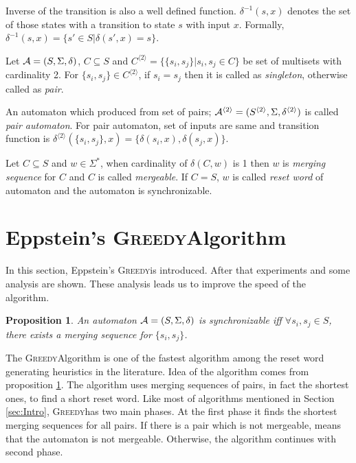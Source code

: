 \documentclass[12pt]{article}
\newtheorem{proposition}{Proposition}[section]
\newcommand{\comment}[2]{{\color{red}{\bf (#1: #2)}}}
\newcommand{\greedyAlgo}{\textsc{Greedy}}
\begin{document}
Inverse of the transition is also a well defined function. $\delta^{-1}(s,x)$ denotes the set of those states with a transition to state $s$ with input $x$. Formally, $\delta^{-1}(s,x) = \{ s' \in S | \delta(s',x)= s\}$.

Let ${\cal A}=(S, \Sigma, \delta)$, $C \subseteq S$ and $C^{\langle 2 \rangle} = \{ \{ s_i, s_j \}| s_i,s_j \in C \}$ be set of multisets  with cardinality 2. For $\{ s_i, s_j \} \in C^{\langle 2 \rangle}$, if $s_i=s_j$ then it is called as \textit{singleton}, otherwise called as \textit{pair}. 

An automaton which produced from set of pairs; ${\cal A}^{\langle 2 \rangle}=(S^{\langle 2 \rangle},\Sigma,\delta^{\langle 2 \rangle})$ is called \textit{pair automaton}. For pair automaton, set of inputs are same and transition function is $\delta^{\langle 2 \rangle}(\{ s_i,s_j \},x) = \{ \delta(s_i,x), \delta(s_j,x) \}$. \comment{sertac}{pair automata icin figure cizilebilir}

Let $C \subseteq S$ and $w \in \Sigma^*$, when cardinality of $\delta(C,w)$ is 1 then $w$ is \textit{merging sequence} for $C$ and $C$ is called \textit{mergeable}. If $C=S$, $w$ is called \textit{reset word} of automaton and the automaton is synchronizable.

\clearpage
\section{Eppstein's \greedyAlgo \space Algorithm}
\label{sec:greedy}
In this section, Eppstein's \greedyAlgo \space is introduced. After that experiments and some analysis are shown. These analysis leads us to improve the speed of the algorithm.

\begin{proposition}
	\label{prop:synchronizable}
	An automaton ${\cal A}=(S,\Sigma,\delta)$ is synchronizable iff $\forall s_i,s_j \in S$, there exists a merging sequence for $\{ s_i, s_j \}$.
\end{proposition}

The \greedyAlgo \space Algorithm is one of the fastest algorithm among the reset word generating heuristics in the literature. Idea of the algorithm comes from proposition \ref{prop:synchronizable}. The algorithm uses merging sequences of pairs, in fact the shortest ones, to find a short reset word. Like most of algorithms mentioned in Section \ref{sec:Intro}, \greedyAlgo \space has two main phases. At the first phase it finds the shortest merging sequences for all pairs. If there is a pair which is not mergeable, means that the automaton is not mergeable. Otherwise, the algorithm continues with second phase.
\end{document}
